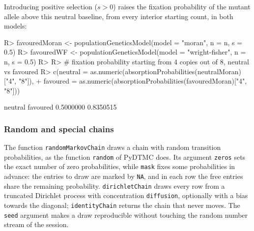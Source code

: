 \documentclass[
  nojss]{jss}
\begin{document}
Introducing positive selection (\(s>0\)) raises the fixation probability of
the mutant allele above this neutral baseline, from every interior
starting count, in both models:

\begin{CodeChunk}
\begin{CodeInput}
R> favouredMoran <- populationGeneticsModel(model = "moran", n = n, s = 0.5)
R> favouredWF <- populationGeneticsModel(model = "wright-fisher", n = n, s = 0.5)
R> 
R> # fixation probability starting from 4 copies out of 8, neutral vs favoured
R> c(neutral = as.numeric(absorptionProbabilities(neutralMoran)["4", "8"]),
+   favoured = as.numeric(absorptionProbabilities(favouredMoran)["4", "8"]))
\end{CodeInput}
\begin{CodeOutput}
  neutral  favoured 
0.5000000 0.8350515 
\end{CodeOutput}
\end{CodeChunk}

\subsubsection{Random and special chains}\label{random-and-special-chains}

The function \texttt{randomMarkovChain} draws a chain with random transition
probabilities, as the function \texttt{random} of PyDTMC does. Its argument \texttt{zeros}
sets the exact number of zero probabilities, while \texttt{mask} fixes some
probabilities in advance: the entries to draw are marked by \texttt{NA}, and in
each row the free entries share the remaining probability. \texttt{dirichletChain} draws every row from a truncated Dirichlet
process with concentration \texttt{diffusion}, optionally with a bias towards the
diagonal; \texttt{identityChain} returns the chain that never moves. The \texttt{seed}
argument makes a draw reproducible without touching the random number
stream of the session.
\end{document}
